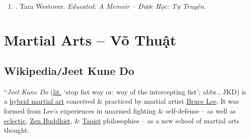 \documentclass{article}
\begin{document}
\begin{enumerate}
\begin{itemize}
		\item ``Whether narrating scenes of fury \& violence or evoking rural landscapes or tortured self-analysis, {\sc Westover} writes with uncommon intelligence \& grace $\ldots$ 1 of the most improbable \& fascinating journeys I've read in recent years.'' -- {\sc Newsday}
	\end{itemize}
	{\sf Author the Author.} {\sc Tara Westover} s an American historian \& memoirist. Her first book, Educated, debuted at \#1 on the New York Times bestseller list \& remained on the list, in hardcover, for more than two years. The book, a memoir of her upbringing in rural Idaho, was a finalist for a number of national awards, including the Los Angeles Times Book Prize, the PEN{\tt/}Jean Stein Book Award, \& the National Book Critics Circle Award. To date it has been translated into more than 45 languages. The New York Times named Educated one of the 10 Best Books of 2018, \& the American Booksellers Association voted Educated the Nonfiction Book of the Year. For her staggering impact, Time named Westover one of the 100 Most Influential People of 2019. Westover holds a PhD in intellectual history from Trinity College, Cambridge, \& in 2019 she was the Rosenthal Writer in Residence at Harvard University. In 2023, she was awarded the National Humanities Medal by President Biden.

	\item \cite{Westover_educated}. {\sc Tara Westover}. {\it Educated: A Memoir -- Được Học: Tự Truyện.}\hfill{\sf[done]}
\end{enumerate}


\section{Martial Arts -- Võ Thuật}

\subsection{Wikipedia{\tt/}Jeet Kune Do}
``{\it Jeet Kune Do} (\href{https://en.wikipedia.org/wiki/Literal_translation}{lit.} `stop fist way or: way of the intercepting fist'; abbr., JKD) is a \href{https://en.wikipedia.org/wiki/Hybrid_martial_arts}{hybrid martial art} conceived \& practiced by martial artist \href{https://en.wikipedia.org/wiki/Bruce_Lee}{\sc Bruce Lee}. It was formed from {\sc Lee}'s experiences in unarmed fighting \& self-defense -- as well as \href{https://en.wikipedia.org/wiki/Eclecticism}{eclectic}, \href{https://en.wikipedia.org/wiki/Zen_Buddhism}{Zen Buddhist}, \& \href{https://en.wikipedia.org/wiki/Taoism}{Taoist} philosophies -- as a new school of martial arts thought.
\end{document}
